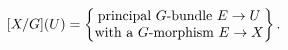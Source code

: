 \documentclass{article}
\begin{document}
\[ [X/G](U) = \left\{ \Centerstack{{principal $G$-bundle $E \to U$} {with a $G$-morphism $E \to X$}} \right\}. \]
\end{document}
